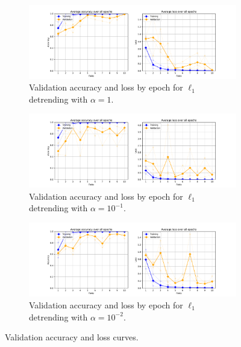 \begin{figure}[p]
    \centering
    \begin{subfigure}{\textwidth}
        \centering
        \includegraphics[trim={3cm 0 3cm 0.8cm},clip,width=\textwidth]{img/ch4/l1/e0/3_epochs_by_fold.pdf}
        \caption{Validation accuracy and loss by epoch for $\ell_1$ detrending with $\alpha = 1$.}
        \label{fig:detrend-acc-loss-3s-e-0}
    \end{subfigure}

    \vspace{0.5cm}
    
    \begin{subfigure}{\textwidth}
        \centering
        \includegraphics[trim={3cm 0 3cm 0.8cm},clip,width=\textwidth]{img/ch4/l1/e-1/3_epochs_by_fold.pdf}
        \caption{Validation accuracy and loss by epoch for $\ell_1$ detrending with $\alpha = 10^{-1}$.}
        \label{fig:detrend-acc-loss-3s-e-1}
    \end{subfigure}

    \vspace{0.5cm}
    
    \begin{subfigure}{\textwidth}
        \centering
        \includegraphics[trim={3cm 0 3cm 0.8cm},clip,width=\textwidth]{img/ch4/l1/e-2/3_epochs_by_fold.pdf}
        \caption{Validation accuracy and loss by epoch for $\ell_1$ detrending with $\alpha = 10^{-2}$.}
        \label{fig:detrend-acc-loss-3s-e-2}
    \end{subfigure}
    \caption{Validation accuracy and loss curves.}    
    \label{fig:detrend-acc-loss-curves-3s}
\end{figure}

